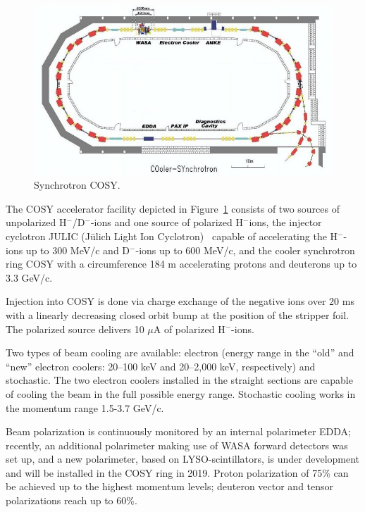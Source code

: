 
\newcommand{\Hm}{H$^-$}
\newcommand{\Dm}{D$^-$}

\begin{figure}[h]
	\centering
	\includegraphics[scale=.5]{images/chapter4/800px-COSY_Ring}
	\caption{Synchrotron COSY.\label{fig:COSY_Ring}}
\end{figure}

The COSY accelerator facility depicted in Figure~\ref{fig:COSY_Ring} consists of two sources of unpolarized \Hm/\Dm-ions and one source of polarized \Hm ions, the injector cyclotron JULIC (J\"ulich Light Ion Cyclotron)~\cite{JULIC-Injector} capable of accelerating the \Hm-ions up to 300 MeV/c and \Dm-ions up to 600 MeV/c, and the cooler synchrotron ring COSY with a circumference 184 m accelerating protons and deuterons
up to 3.3 GeV/c.~\cite{COSY-Ring}

Injection into COSY is done via charge exchange of the negative ions over 20 ms with a linearly decreasing
closed orbit bump at the position of the stripper foil. The polarized source delivers 10 $\mu$A of polarized \Hm-ions.~\cite{COSY-Ring}

Two types of beam cooling are available: electron (energy range in the ``old'' and ``new'' electron coolers: 20--100 keV and 20--2,000 keV, respectively) and stochastic. 
%
The two electron coolers installed in the straight sections are capable of cooling the beam in the full possible energy range. Stochastic cooling works in the momentum range 1.5-3.7 GeV/c.

Beam polarization is continuously monitored  by an internal polarimeter EDDA; recently, an additional polarimeter making use of WASA forward detectors was set up, and a new polarimeter, based on LYSO-scintillators, is under development and will be installed in the COSY ring in 2019.
Proton polarization of 75\% can be achieved up to the highest momentum levels; deuteron vector and tensor polarizations reach up to 60\%.~\cite[\textbf{Historical background}]{YellowReport}